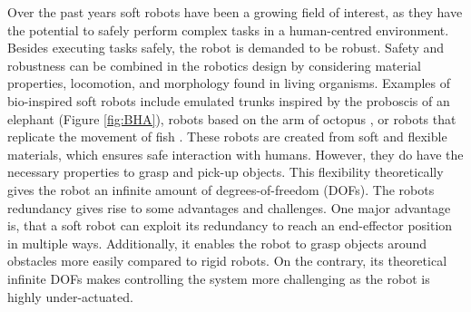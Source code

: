 Over the past years soft robots have been a growing field of interest, as they have the potential to safely perform complex tasks in a human-centred environment. Besides executing tasks safely, the robot is demanded to be robust. Safety and robustness can be combined in the robotics design by considering material properties, locomotion, and morphology found in living organisms. Examples of bio-inspired soft robots include emulated trunks \cite{hannan2003kinematics} inspired by the proboscis of an elephant (Figure \ref{fig:BHA}), robots based on the arm of octopus \cite{wang2013visual}, or robots that replicate the movement of fish \cite{marchese2014autonomous}. These robots are created from soft and flexible materials, which ensures safe interaction with humans. However, they do have the necessary properties to grasp and pick-up objects. This flexibility theoretically gives the robot an infinite amount of degrees-of-freedom (DOFs). The robots redundancy gives rise to some advantages and challenges. One major advantage is, that a soft robot can exploit its redundancy to reach an end-effector position in multiple ways. Additionally, it enables the robot to grasp objects around obstacles more easily compared to rigid robots. On the contrary, its theoretical infinite DOFs makes controlling the system more challenging as the robot is highly under-actuated. 


